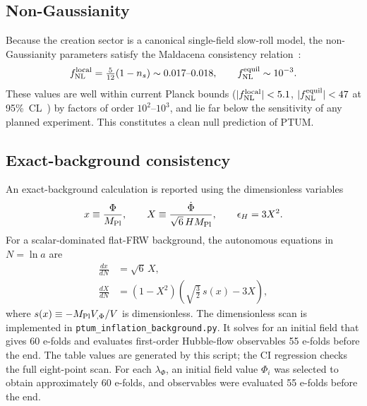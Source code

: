 \documentclass[epj]{svjour}
\begin{document}
\subsection{Non-Gaussianity}

Because the creation sector is a canonical single-field slow-roll
model, the non-Gaussianity parameters satisfy the Maldacena
consistency relation~\cite{Maldacena2003}:
\begin{equation}
f_{\rm NL}^{\rm local}
=\tfrac{5}{12}(1-n_s)\sim0.017\text{--}0.018,\qquad
f_{\rm NL}^{\rm equil}\sim10^{-3}.
\end{equation}
These values are well within current Planck bounds
(\(|f_{\rm NL}^{\rm local}|<5.1\),
\(|f_{\rm NL}^{\rm equil}|<47\) at 95\%~CL~\cite{PlanckNG})
by factors of order \(10^2\)--\(10^3\), and lie far below the
sensitivity of any planned experiment. This constitutes a clean
null prediction of PTUM.

\subsection{Exact-background consistency}

An exact-background calculation is reported using the
dimensionless variables
\begin{equation}
x\equiv\frac{\Phi}{M_{\rm Pl}},\qquad
X\equiv\frac{\dot\Phi}{\sqrt{6}\,H M_{\rm Pl}},\qquad
\epsilon_H=3X^2.
\end{equation}
For a scalar-dominated flat-FRW background, the autonomous equations
in \(N=\ln a\) are
\begin{align}
\frac{dx}{dN}&=\sqrt{6}\,X,\\[4pt]
\frac{dX}{dN}&=(1-X^2)\!
\left(\sqrt{\tfrac{3}{2}}\,s(x)-3X\right),
\end{align}
where \(s(x)\equiv-M_{\rm Pl}V_{,\Phi}/V\) is dimensionless.
The dimensionless scan is implemented in
\texttt{ptum\_inflation\_background.py}. It solves for an initial field
that gives 60 e-folds and evaluates first-order Hubble-flow observables
55 e-folds before the end. The table values are generated by this
script; the CI regression checks the full eight-point scan. For each \(\lambda_\Phi\), an initial
field value \(\Phi_i\) was selected to obtain approximately 60
e-folds, and observables were evaluated 55 e-folds before the end.
\end{document}
